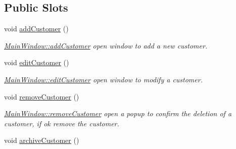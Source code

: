 \subsection*{Public Slots}
\begin{DoxyCompactItemize}
\item 
\hypertarget{classGui_1_1MainWindow_a52d033c14efb98b5b389121b8d60f2fe}{void \hyperlink{classGui_1_1MainWindow_a52d033c14efb98b5b389121b8d60f2fe}{add\-Customer} ()}\label{classGui_1_1MainWindow_a52d033c14efb98b5b389121b8d60f2fe}

\begin{DoxyCompactList}\small\item\em \hyperlink{classGui_1_1MainWindow_a52d033c14efb98b5b389121b8d60f2fe}{Main\-Window\-::add\-Customer} open window to add a new customer. \end{DoxyCompactList}\item 
\hypertarget{classGui_1_1MainWindow_a6487a725a2b58b89062944778ac59eca}{void \hyperlink{classGui_1_1MainWindow_a6487a725a2b58b89062944778ac59eca}{edit\-Customer} ()}\label{classGui_1_1MainWindow_a6487a725a2b58b89062944778ac59eca}

\begin{DoxyCompactList}\small\item\em \hyperlink{classGui_1_1MainWindow_a6487a725a2b58b89062944778ac59eca}{Main\-Window\-::edit\-Customer} open window to modify a customer. \end{DoxyCompactList}\item 
\hypertarget{classGui_1_1MainWindow_ab86dd052f06fb56dbd77e3ae4c228796}{void \hyperlink{classGui_1_1MainWindow_ab86dd052f06fb56dbd77e3ae4c228796}{remove\-Customer} ()}\label{classGui_1_1MainWindow_ab86dd052f06fb56dbd77e3ae4c228796}

\begin{DoxyCompactList}\small\item\em \hyperlink{classGui_1_1MainWindow_ab86dd052f06fb56dbd77e3ae4c228796}{Main\-Window\-::remove\-Customer} open a popup to confirm the deletion of a customer, if ok remove the customer. \end{DoxyCompactList}\item 
\hypertarget{classGui_1_1MainWindow_a8fb7964262a931657329a4c13afb2dad}{void \hyperlink{classGui_1_1MainWindow_a8fb7964262a931657329a4c13afb2dad}{archive\-Customer} ()}\label{classGui_1_1MainWindow_a8fb7964262a931657329a4c13afb2dad}


\end{DoxyCompactItemize}
